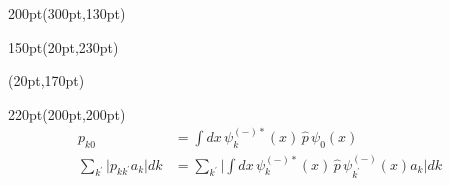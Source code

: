 \begin{frame}
%
%
%
%
\begin{textblock*}{200pt}(300pt,130pt)
\end{textblock*}


\begin{textblock*}{150pt}(20pt,230pt)
\end{textblock*}


\begin{textblock*}{\linewidth}(20pt,170pt)
\end{textblock*}


\begin{textblock*}{220pt}(200pt,200pt)
\scriptsize
%
\begin{align}
p_{k0} & = \int dx\,\psi_k^{(-)*}(x)\,\hat{p}\, \psi_0(x) \label{eqn:eq_pk0}\\
	\sum_{k^\prime} \Big| p_{kk^\prime}a_k \Big| dk 
      & = \sum_{k^\prime} \Big| \int dx\, \psi_k^{(-)*}(x)\,\hat{p}\,\psi_{k^\prime}^{(-)}(x) a_k \Big| dk \label{eqn:eq_pkkak}
\end{align}

\end{textblock*}

\end{frame}




